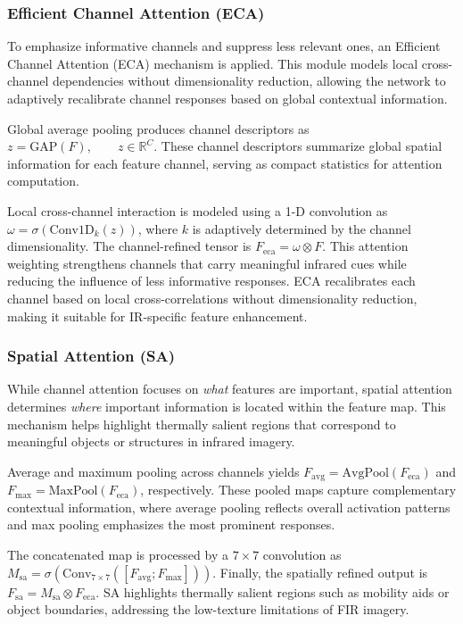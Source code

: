 \documentclass[journal,twoside,web]{ieeecolor}
\begin{document}
\subsubsection{Efficient Channel Attention (ECA)}

To emphasize informative channels and suppress less relevant ones, an Efficient Channel Attention (ECA) mechanism is applied. This module models local cross-channel dependencies without dimensionality reduction, allowing the network to adaptively recalibrate channel responses based on global contextual information.

Global average pooling produces channel descriptors as $z = \mathrm{GAP}(F), \qquad z\in\mathbb{R}^{C}$. These channel descriptors summarize global spatial information for each feature channel, serving as compact statistics for attention computation.

Local cross-channel interaction is modeled using a 1-D convolution as $
\omega = \sigma(\mathrm{Conv1D}_k(z))$,
where $k$ is adaptively determined by the channel dimensionality. The channel-refined tensor is $
F_{\text{eca}} = \omega \otimes F$. This attention weighting strengthens channels that carry meaningful infrared cues while reducing the influence of less informative responses. ECA recalibrates each channel based on local cross-correlations without dimensionality reduction, making it suitable for IR-specific feature enhancement.

\subsubsection{Spatial Attention (SA)}
While channel attention focuses on \emph{what} features are important, spatial attention determines \emph{where} important information is located within the feature map. This mechanism helps highlight thermally salient regions that correspond to meaningful objects or structures in infrared imagery.

Average and maximum pooling across channels yields $
F_{\text{avg}}=\mathrm{AvgPool}(F_{\text{eca}})$ and $F_{\text{max}}=\mathrm{MaxPool}(F_{\text{eca}})$, respectively. These pooled maps capture complementary contextual information, where average pooling reflects overall activation patterns and max pooling emphasizes the most prominent responses.

The concatenated map is processed by a $7\times7$ convolution as
$
M_{\text{sa}} = \sigma(\mathrm{Conv}_{7\times7}([F_{\text{avg}};F_{\text{max}}]))$. Finally, the spatially refined output is
$
F_{\text{sa}} = M_{\text{sa}} \otimes F_{\text{eca}}$.
SA highlights thermally salient regions such as mobility aids or object boundaries, addressing the low-texture limitations of FIR imagery.
\end{document}
